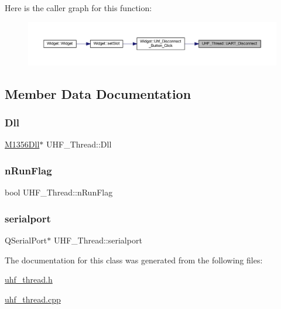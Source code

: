 Here is the caller graph for this function\+:
\nopagebreak
\begin{figure}[H]
\begin{center}
\leavevmode
\includegraphics[width=350pt]{class_u_h_f___thread_a4d29770cacd38ec97148b8642df794b8_icgraph}
\end{center}
\end{figure}


\subsection{Member Data Documentation}
\mbox{\label{class_u_h_f___thread_a64b7885c54cd1b820beb220461e9d04a}} 
\subsubsection{\texorpdfstring{Dll}{Dll}}
{\footnotesize\ttfamily \mbox{\hyperlink{class_m1356_dll}{M1356\+Dll}}$\ast$ U\+H\+F\+\_\+\+Thread\+::\+Dll\hspace{0.3cm}{\ttfamily [private]}}

\mbox{\label{class_u_h_f___thread_ab40811b93c5e8b31c4f40cc79139e504}} 
\subsubsection{\texorpdfstring{nRunFlag}{nRunFlag}}
{\footnotesize\ttfamily bool U\+H\+F\+\_\+\+Thread\+::n\+Run\+Flag}

\mbox{\label{class_u_h_f___thread_a20904e9764b311fdb015c3fd6cbec497}} 
\subsubsection{\texorpdfstring{serialport}{serialport}}
{\footnotesize\ttfamily Q\+Serial\+Port$\ast$ U\+H\+F\+\_\+\+Thread\+::serialport\hspace{0.3cm}{\ttfamily [private]}}



The documentation for this class was generated from the following files\+:\begin{DoxyCompactItemize}
\item 
\mbox{\hyperlink{uhf__thread_8h}{uhf\+\_\+thread.\+h}}\item 
\mbox{\hyperlink{uhf__thread_8cpp}{uhf\+\_\+thread.\+cpp}}\end{DoxyCompactItemize}
